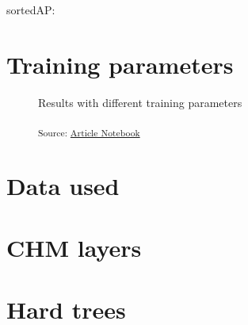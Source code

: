 \documentclass[
]{report}
\begin{document}
sortedAP: \autocite{sortedAP}

\section{Training parameters}\label{training-parameters}

\begin{figure}[H]


\caption{\label{fig-training-parameters}Results with different training
parameters}

\end{figure}%

\begin{figure}

\textsubscript{Source:
\href{https://ZokszY.github.io/Geodan-internship-report/index-preview.html}{Article
Notebook}}

\end{figure}%

\section{Data used}\label{data-used}

\section{CHM layers}\label{chm-layers}

\section{Hard trees}\label{hard-trees}
\end{document}
